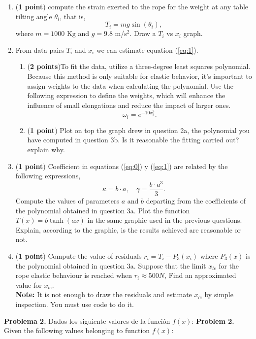 \begin{paracol}{2}
\begin{enumerate}
	\item (\textbf{1 point}) compute the strain exerted to the rope for the weight at any table tilting angle $\theta_i$, that is,
	 \begin{equation} \label{eq:2}
	 	T_i = mg\sin(\theta_i),
	 \end{equation}
	 where  $m =1000$ Kg and $g = 9.8$ m/s$^2$. Draw a  $T_i$ vs $x_i$ graph.
	 \item From data pairs $T_i$ and $x_i$ we can estimate equation  (\ref{eq:1}).
	 \begin{enumerate}
	 	\item (\textbf{2 points})To fit the data, utilize a three-degree least squares polynomial. Because this method is only suitable for elastic behavior, it's important to assign weights to the data when calculating the polynomial. Use the following expression to define the weights, which will enhance the influence of small elongations and reduce the impact of larger ones.
	 	\begin{equation}
	 		\omega_i = e^{-10x_i^2}.
	 	\end{equation}
	 	\item (\textbf{1 point}) Plot on top the graph drew in question 2a, the polynomial you have computed in question 3b. Is it reasonable the fitting carried out? explain why.
	 \end{enumerate}
	 \item (\textbf{1 point}) Coefficient in equations  (\ref{eq:0}) y (\ref{eq:1}) are related by the following expressions,
	 \begin{equation}
	 	\kappa = b\cdot a, \quad \gamma = \frac{b\cdot a^3}{3}. \nonumber
	 \end{equation}
	 Compute the values of parameters $a$ and $b$ departing from the coefficients of the polynomial obtained in question 3a. Plot the function $T(x) = b\tanh(ax)$ in the same graphic used in the previous questions. Explain, according to the graphic, is the results achieved are reasonable or not.
	 \item (\textbf{1 point}) Compute the value of residuals $r_i=T_i-P_3(x_i)$ where $P_3(x)$ is the polynomial obtained in question 3a. Suppose that the limit $x_{le}$ for the rope elastic behaviour is reached when $r_i \approx 500 N$, Find an approximated value for $x_{le}$.\\
	 \textbf{Note:} It is not enough to draw the residuals and estimate $x_{le}$ by simple inspection. You must use code to do it.	     
\end{enumerate}
\end{paracol}
\begin{paracol}{2}
\noindent \textbf{Problema 2.} Dados los siguiente valores de la función $f(x)$:
\switchcolumn
\noindent \textbf{Problem 2.} Given the following values belonging to function $f(x)$:
\end{paracol}

